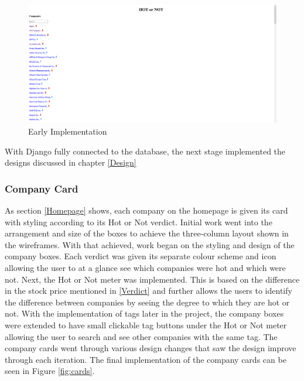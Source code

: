         \begin{figure}[!h]
                \centering
                \includegraphics[width=0.5\linewidth]{images/upload/EarlyHome.png}    
                \caption{Early Implementation}
                \label{fig:Home_early}
        \end{figure}
            
        With Django fully connected to the database, the next stage implemented the designs discussed in chapter \ref{Design}
        
            \subsubsection{Company Card}
            As section \ref{Homepage} shows, each company on the homepage is given its card with styling according to its Hot or Not verdict. Initial work went into the arrangement and size of the boxes to achieve the three-column layout shown in the wireframes. With that achieved, work began on the styling and design of the company boxes. Each verdict was given its separate colour scheme and icon allowing the user to at a glance see which companies were hot and which were not. Next, the Hot or Not meter was implemented. This is based on the difference in the stock price mentioned in \ref{Verdict} and further allows the users to identify the difference between companies by seeing the degree to which they are hot or not. With the implementation of tags later in the project, the company boxes were extended to have small clickable tag buttons under the Hot or Not meter allowing the user to search and see other companies with the same tag. The company cards went through various design changes that saw the design improve through each iteration. The final implementation of the company cards can be seen in Figure \ref{fig:cards}. 
            
